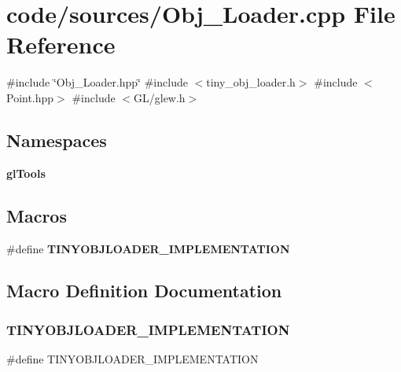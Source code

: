 \section{code/sources/\+Obj\+\_\+\+Loader.cpp File Reference}
\label{_obj___loader_8cpp}
{\ttfamily \#include \char`\"{}Obj\+\_\+\+Loader.\+hpp\char`\"{}}\newline
{\ttfamily \#include $<$tiny\+\_\+obj\+\_\+loader.\+h$>$}\newline
{\ttfamily \#include $<$Point.\+hpp$>$}\newline
{\ttfamily \#include $<$G\+L/glew.\+h$>$}\newline
\subsection*{Namespaces}
\begin{DoxyCompactItemize}
\item 
 \textbf{ gl\+Tools}
\end{DoxyCompactItemize}
\subsection*{Macros}
\begin{DoxyCompactItemize}
\item 
\#define \textbf{ T\+I\+N\+Y\+O\+B\+J\+L\+O\+A\+D\+E\+R\+\_\+\+I\+M\+P\+L\+E\+M\+E\+N\+T\+A\+T\+I\+ON}
\end{DoxyCompactItemize}


\subsection{Macro Definition Documentation}
\mbox{\label{_obj___loader_8cpp_af14fac7fbc250522a78849d58d5b0811}} 
\subsubsection{TINYOBJLOADER\_IMPLEMENTATION}
{\footnotesize\ttfamily \#define T\+I\+N\+Y\+O\+B\+J\+L\+O\+A\+D\+E\+R\+\_\+\+I\+M\+P\+L\+E\+M\+E\+N\+T\+A\+T\+I\+ON}

